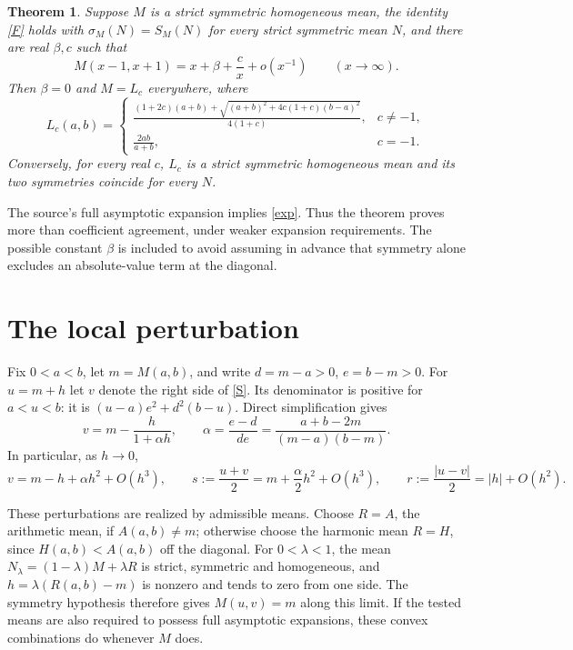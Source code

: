 \documentclass[11pt]{article}
\newtheorem{theorem}{Theorem}
\begin{document}
\begin{theorem}\label{main}
Suppose $M$ is a strict symmetric homogeneous mean, the identity
\eqref{F} holds with $\sigma_M(N)=S_M(N)$ for every strict symmetric
mean $N$, and there are real $\beta,c$ such that
\begin{equation}\label{exp}
 M(x-1,x+1)=x+\beta+\frac{c}{x}+o(x^{-1})\qquad(x\to\infty).
\end{equation}
Then $\beta=0$ and $M=L_c$ everywhere, where
\begin{equation}\label{Lc}
 L_c(a,b)=
 \begin{cases}
 \displaystyle\frac{(1+2c)(a+b)+
 \sqrt{(a+b)^2+4c(1+c)(b-a)^2}}{4(1+c)},&c\ne-1,\\[6pt]
 \displaystyle\frac{2ab}{a+b},&c=-1.
 \end{cases}
\end{equation}
Conversely, for every real $c$, $L_c$ is a strict symmetric homogeneous
mean and its two symmetries coincide for every $N$.
\end{theorem}

The source's full asymptotic expansion implies \eqref{exp}. Thus the
theorem proves more than coefficient agreement, under weaker expansion
requirements. The possible constant $\beta$ is included to avoid
assuming in advance that symmetry alone excludes an absolute-value
term at the diagonal.

\section*{The local perturbation}
Fix $0<a<b$, let $m=M(a,b)$, and write $d=m-a>0$, $e=b-m>0$.
For $u=m+h$ let $v$ denote the right side of \eqref{S}. Its denominator
is positive for $a<u<b$: it is $(u-a)e^2+d^2(b-u)$.
Direct simplification gives
\begin{equation}\label{reflection}
 v=m-\frac{h}{1+\alpha h},\qquad
 \alpha=\frac{e-d}{de}=\frac{a+b-2m}{(m-a)(b-m)}.
\end{equation}
In particular, as $h\to0$,
\[
 v=m-h+\alpha h^2+O(h^3),\qquad
 s:=\frac{u+v}{2}=m+\frac\alpha2h^2+O(h^3),\qquad
 r:=\frac{|u-v|}{2}=|h|+O(h^2).
\]

These perturbations are realized by admissible means. Choose $R=A$,
the arithmetic mean, if $A(a,b)\ne m$; otherwise choose the harmonic
mean $R=H$, since $H(a,b)<A(a,b)$ off the diagonal. For
$0<\lambda<1$, the mean $N_\lambda=(1-\lambda)M+\lambda R$ is strict,
symmetric and homogeneous, and
$h=\lambda(R(a,b)-m)$ is nonzero and tends to zero from one side.
The symmetry hypothesis therefore gives $M(u,v)=m$ along this limit.
If the tested means are also required to possess full asymptotic
expansions, these convex combinations do whenever $M$ does.
\end{document}
